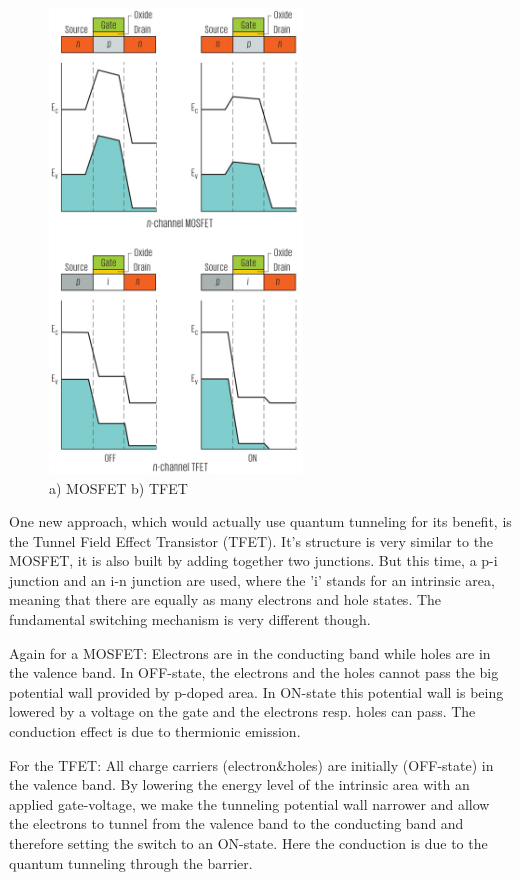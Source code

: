 \documentclass[11pt]{article}
\begin{document}
\begin{figure}[H]
\centering
\includegraphics[width=0.6\textwidth]{MOSFETvsTFET}%
\caption{a) MOSFET   b) TFET}
\label{fig:MOSFETvsTFET}
\end{figure}

One new approach, which would actually use quantum tunneling for its benefit, is the Tunnel Field Effect Transistor (TFET). It's structure is very similar to the MOSFET, it is also built by adding together two junctions. But this time, a p-i junction and an i-n junction are used, where the 'i' stands for an intrinsic area, meaning that there are equally as many electrons and hole states. The fundamental switching mechanism is very different though. 


Again for a MOSFET: Electrons are in the conducting band while holes are in the valence band. In OFF-state, the electrons and the holes cannot pass the big potential wall provided by p-doped area. In ON-state this potential wall is being lowered by a voltage on the gate and the electrons resp. holes can pass. The conduction effect is due to thermionic emission.


For the TFET: All charge carriers (electron\&holes) are initially (OFF-state) in the valence band. By lowering the energy level of the intrinsic area with an applied gate-voltage, we make the tunneling potential wall narrower and allow the electrons to tunnel from the valence band to the conducting band and therefore setting the switch to an ON-state. Here the conduction is due to the quantum tunneling through the barrier. 
\end{document}
